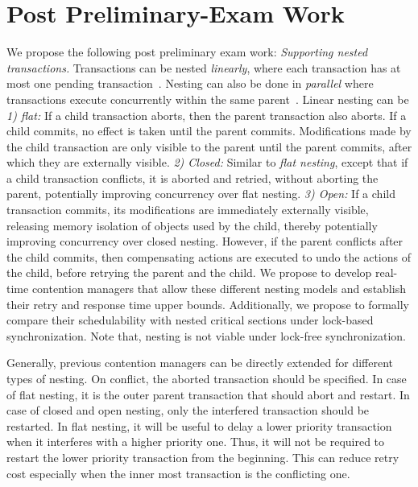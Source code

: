 \documentclass[12pt,english]{report}
\begin{document}
\section{Post Preliminary-Exam Work}

We propose the following post preliminary exam work:
\textit{Supporting nested transactions.} Transactions can be nested \textit{linearly}, where each transaction has at most one pending transaction~\cite{Moss2006186}. Nesting can also be done in \textit{parallel} where transactions execute concurrently within the same parent~\cite{volos2009nepaltm}. Linear nesting can be \textit{1) flat:} If a child transaction aborts, then the parent transaction also aborts. If a child commits, no effect is taken until the parent commits. Modifications made by the child transaction are only visible to the parent until the parent commits, after which they are externally visible. 
%
\textit{2) Closed:} Similar to \textit{flat nesting}, except that if a child transaction conflicts, it is aborted and retried, without aborting the parent, potentially improving concurrency over flat nesting. 
%
\textit{3) Open:} If a child transaction commits, its modifications are immediately externally visible, releasing memory isolation  of objects used by the child, thereby potentially improving concurrency over closed nesting. However, if the parent conflicts after the child commits, then compensating actions are executed to undo the actions of the child, before retrying the parent and the child. 
We propose to develop real-time contention managers that allow these different nesting models and establish their retry and response time upper bounds. Additionally, we propose to formally compare their schedulability with nested critical sections under lock-based synchronization. Note that, nesting is not viable under lock-free synchronization.

Generally, previous contention managers can be directly extended for different types of nesting. On conflict, the aborted transaction should be specified. In case of flat nesting, it is the outer parent transaction that should abort and restart. In case of closed and open nesting, only the interfered transaction should be restarted. In flat nesting, it will be useful to delay a lower priority transaction when it interferes with a higher priority one. Thus, it will not be required to restart the lower priority transaction from the beginning. This can reduce retry cost especially when the inner most transaction is the conflicting one.
\end{document}
